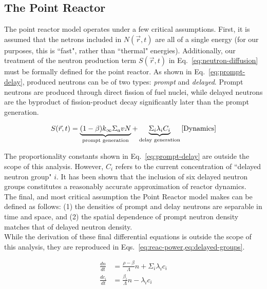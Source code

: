 \documentclass[review,onefignum,onetabnum]{siamart171218}
\begin{document}
\subsection{The Point Reactor}
The point reactor model operates under a few critical assumptions. First,
it is assumed that the netrons included in $N(\vec{r}, t)$ are all of a single
energy (for our purposes, this is ``fast", rather than ``thermal" energies).
Additionally, our treatment of the neutron production term $S(\vec{r}, t)$
in Eq.~\cref{eq:neutron-diffusion} must be formally defined for the point
reactor. As shown in Eq.~\cref{eq:prompt-delay}, produced neutrons can be of
two types: \emph{prompt} and \emph{delayed}. Prompt neutrons are produced
through direct fission of fuel nuclei, while delayed neutrons are the
byproduct of fission-product decay significantly later than the prompt
generation.

\begin{equation}
  S(\vec{r}, t) = \underbrace{(1-\beta)k_{\infty}\Sigma_avN}_{\text{prompt generation}} + \underbrace{\Sigma_i\lambda_iC_i}_{\text{delay generation}}
  \label{eq:prompt-delay}\cite{Dynamics}
\end{equation}

The proportionality constants shown in Eq.~\cref{eq:prompt-delay} are outside
the scope of this analysis. However, $C_i$ refers to the current concentration
of ``delayed neutron group" $i$. It has been shown that the inclusion of six
delayed neutron groups constitutes a reasonably accurate approximation of reactor
dynamics.\cite{Keepin} \\

The final, and most critical assumption the Point Reactor model makes can be
defined as follows: (1) the densities of prompt and delay neutrons are separable
in time and space, and (2) the spatial dependence of prompt neutron density matches
that of delayed neutron density. \\

While the derivation of these final differential equations is outside the scope
of this analysis, they are reproduced in Eqs.~\cref{eq:reac-power,eq:delayed-groups}.

\begin{align}
  \label{eq:reac-power}
  \frac{dn}{dt} &= \frac{\rho - \beta}{\Lambda}n + \Sigma_i\lambda_i c_i \\
  \label{eq:delayed-groups}
  \frac{dc_i}{dt} &= \frac{\beta_i}{\Lambda}n - \lambda_i c_i
\end{align}
\end{document}
